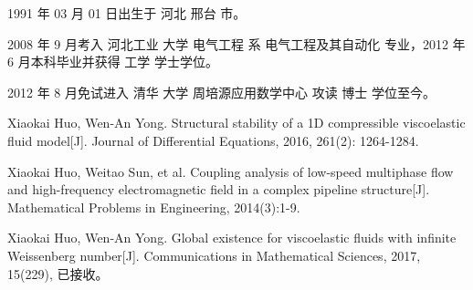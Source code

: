 \begin{resume}


  1991 年 03 月 01 日出生于 河北 邢台 市。

  2008 年 9 月考入 河北工业 大学  电气工程 系 电气工程及其自动化 专业，2012 年 6 月本科毕业并获得 工学 学士学位。

  2012 年 8 月免试进入 清华 大学 周培源应用数学中心 攻读 博士 学位至今。


  \begin{publications}
  \item Xiaokai Huo, Wen-An Yong. Structural stability of a 1D compressible viscoelastic fluid model[J]. Journal of Differential Equations, 2016, 261(2): 1264-1284.
  \item Xiaokai Huo, Weitao Sun, et al. Coupling analysis of low-speed multiphase flow and high-frequency electromagnetic field in a complex pipeline structure[J]. Mathematical Problems in Engineering, 2014(3):1-9.
  \item Xiaokai Huo, Wen-An Yong. Global existence for viscoelastic fluids with infinite Weissenberg number[J]. Communications in Mathematical Sciences, 2017, 15(229), 已接收。 
  \end{publications}

\end{resume}
